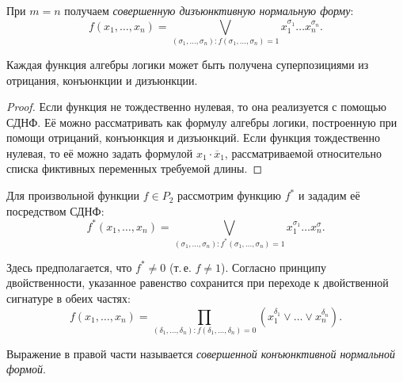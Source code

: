 \begin{definition}
    При $m = n$ получаем \textit{совершенную дизъюнктивную нормальную форму}:
    \[f(x_1, \ldots, x_n) = \bigvee\limits_{(\sigma_1, \ldots, \sigma_n): f(\sigma_1, \ldots, \sigma_n) = 1}x_1^{\sigma_1}\ldots x_n^{\sigma_n}.\]
\end{definition}

\begin{theorem}
    Каждая функция алгебры логики может быть получена суперпозициями из отрицания, конъюнкции и дизъюнкции.
\end{theorem}

\begin{proof}
    Если функция не тождественно нулевая, то она реализуется с помощью СДНФ. Её можно рассматривать как формулу алгебры логики, построенную при помощи отрицаний, конъюнкция и дизъюнкций. Если функция тождественно нулевая, то её можно задать формулой $x_1 \cdot \overline{x}_1$, рассматриваемой относительно списка фиктивных переменных требуемой длины.
\end{proof}

Для произвольной функции $f \in P_2$ рассмотрим функцию $f^\ast$ и зададим её посредством СДНФ:
\[
    f^\ast(x_1, \ldots, x_n) = \bigvee_{(\sigma_1, \ldots, \sigma_n): f^\ast(\sigma_1, \ldots, \sigma_n) = 1}x_1^{\sigma_1} \ldots x_n^\sigma.
\]

Здесь предполагается, что $f^\ast \ne 0$ (т.\,е. $f \ne 1$). Согласно принципу двойственности, указанное равенство сохранится при переходе к двойственной сигнатуре в обеих частях:
\[
    f(x_1, \ldots, x_n) = \prod_{(\delta_1, \ldots, \delta_n): f(\delta_1, \ldots, \delta_n) = 0}(x_1^{\delta_1} \vee \ldots\vee x_n^{\delta_n}).
\]

\begin{definition}
    Выражение в правой части называется \textit{совершенной конъюнктивной нормальной формой}.
\end{definition}

